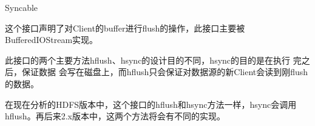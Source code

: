 \begin{XeClass}{Syncable}
   
 这个接口声明了对Client的buffer进行flush的操作，此接口主要被
 BufferedIOStream实现。
 
 此接口的两个主要方法hflush、hsync的设计目的不同，hsync的目的是在执行
 完之后，保证数据
 会写在磁盘上，而hflush只会保证对数据源的新Client会读到刚flush的数据。
 
 在现在分析的HDFS版本中，这个接口的hflush和hsync方法一样，hsync会调用
 hflush。再后来2.x版本中，这两个方法将会有不同的实现。

\end{XeClass}
